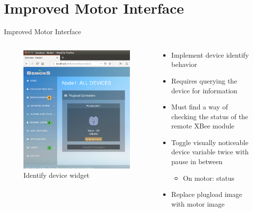 \documentclass{beamer}
\begin{document}
\section{Improved Motor Interface}
\begin{frame}{Improved Motor Interface}{}
\begin{columns}[T]
\begin{column}{0.5\textwidth}
\begin{figure}
\includegraphics[scale=0.25]{figs/deviceIdentifyPlugload.png}
\caption{Identify device widget}
\end{figure}
\end{column}
\begin{column}{0.5\textwidth}
	\begin{itemize}
		\item Implement device identify behavior  
		\item Requires querying the device for information
		\item Must find a way of checking the status of the remote XBee module
		\item Toggle visually noticeable device variable twice with pause in between
		\begin{itemize}
			\item On motor: status
		\end{itemize}
		\item Replace plugload image with motor image
	\end{itemize}
\end{column}
\end{columns}	
\end{frame}
\end{document}
